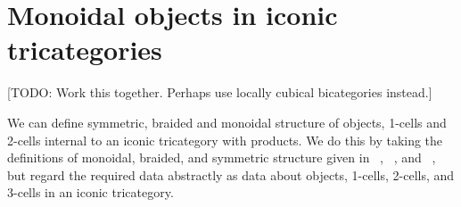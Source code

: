 \section{Monoidal objects in iconic tricategories}
\label{sec:mono-objects}

[TODO: Work this together.  Perhaps use locally cubical bicategories instead.]

We can define symmetric, braided and monoidal structure of objects, 1-cells and 2-cells internal to an iconic tricategory with products. 
We do this by taking the definitions of monoidal, braided, and symmetric structure given in ~\cite{nick:tricatsbook}, ~\cite{mccrudden:bal-coalgb}, and ~\cite{gg:ldstr-tricat}, but regard the required data abstractly as data about objects, 1-cells, 2-cells, and 3-cells in an iconic tricategory. 

